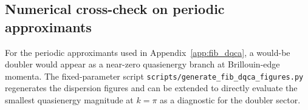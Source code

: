 \subsection{Numerical cross-check on periodic approximants}
For the periodic approximants used in Appendix~\ref{app:fib_dqca}, a would-be doubler would appear as a near-zero quasienergy branch at Brillouin-edge momenta. The fixed-parameter script \texttt{scripts/generate\_fib\_dqca\_figures.py} regenerates the dispersion figures and can be extended to directly evaluate the smallest quasienergy magnitude at $k=\pi$ as a diagnostic for the doubler sector.

